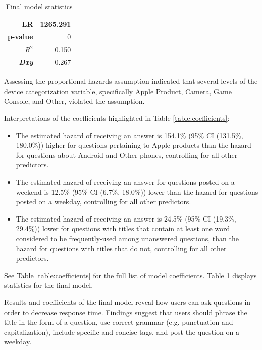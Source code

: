 \documentclass{article}
\begin{document}
\begin{table}[!htbp]
\centering
\begin{tabular}{| r | r |}
  \hline
  \textbf{LR} & 1265.291 \\ \hline
  \textbf{p-value} & 0 \\ \hline
  \textbf{$R^2$} & 0.150 \\ \hline
  \textbf{\textit{Dxy}} & 0.267 \\ \hline
\end{tabular}
\caption{Final model statistics} 
\label{table:final model}
\end{table}

Assessing the proportional hazards assumption indicated that several levels of the device categorization variable, specifically Apple Product, Camera, Game Console, and Other, violated the assumption. 

Interpretations of the coefficients highlighted in Table \ref{table:coefficients}:

\begin{itemize}
  \item The estimated hazard of receiving an answer is 154.1\% (95\% CI (131.5\%, 180.0\%)) higher for questions pertaining to Apple products than the hazard for questions about Android and Other phones, controlling for all other predictors.
  \item The estimated hazard of receiving an answer for questions posted on a weekend is 12.5\% (95\% CI (6.7\%, 18.0\%)) lower than the hazard for questions posted on a weekday, controlling for all other predictors.
  \item The estimated hazard of receiving an answer is 24.5\% (95\% CI (19.3\%, 29.4\%)) lower for questions with titles that contain at least one word considered to be frequently-used among unanswered questions, than the hazard for questions with titles that do not, controlling for all other predictors. 
\end{itemize}

See Table \ref{table:coefficients} for the full list of model coefficients. Table \ref{table:final model} displays statistics for the final model. 

Results and coefficients of the final model reveal how users can ask questions in order to decrease response time. Findings suggest that users should phrase the title in the form of a question, use correct grammar (e.g. punctuation and capitalization), include specific and concise tags, and post the question on a weekday. 
\end{document}
